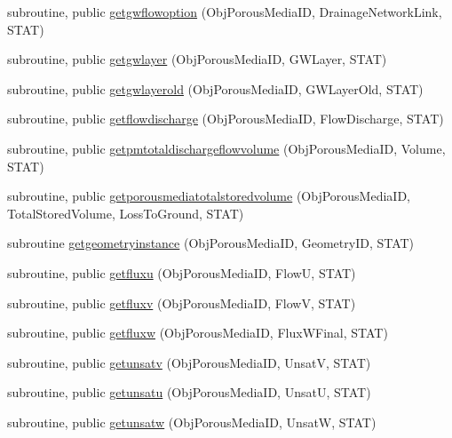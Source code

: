 \begin{DoxyCompactItemize}
\item 
subroutine, public \mbox{\hyperlink{namespacemoduleporousmedia_a959d8f66b0c720fa0d26da43495843eb}{getgwflowoption}} (Obj\+Porous\+Media\+ID, Drainage\+Network\+Link, S\+T\+AT)
\item 
subroutine, public \mbox{\hyperlink{namespacemoduleporousmedia_a48f51dadcb6b3234ad3625d8e26cb7bc}{getgwlayer}} (Obj\+Porous\+Media\+ID, G\+W\+Layer, S\+T\+AT)
\item 
subroutine, public \mbox{\hyperlink{namespacemoduleporousmedia_aa697c2ff7c0b471220e55d71bd4c665a}{getgwlayerold}} (Obj\+Porous\+Media\+ID, G\+W\+Layer\+Old, S\+T\+AT)
\item 
subroutine, public \mbox{\hyperlink{namespacemoduleporousmedia_a26ca2f410bb96e145f78213b45a7a519}{getflowdischarge}} (Obj\+Porous\+Media\+ID, Flow\+Discharge, S\+T\+AT)
\item 
subroutine, public \mbox{\hyperlink{namespacemoduleporousmedia_a4ef35ba24ac6cd6fbf310e39c0892c80}{getpmtotaldischargeflowvolume}} (Obj\+Porous\+Media\+ID, Volume, S\+T\+AT)
\item 
subroutine, public \mbox{\hyperlink{namespacemoduleporousmedia_a3a5ad5a7ceee985765e313febb118f98}{getporousmediatotalstoredvolume}} (Obj\+Porous\+Media\+ID, Total\+Stored\+Volume, Loss\+To\+Ground, S\+T\+AT)
\item 
subroutine \mbox{\hyperlink{namespacemoduleporousmedia_abf74842fd7f071be6dfbcb008ae86d92}{getgeometryinstance}} (Obj\+Porous\+Media\+ID, Geometry\+ID, S\+T\+AT)
\item 
subroutine, public \mbox{\hyperlink{namespacemoduleporousmedia_adf0daee2f37be73787378affc272dbc0}{getfluxu}} (Obj\+Porous\+Media\+ID, FlowU, S\+T\+AT)
\item 
subroutine, public \mbox{\hyperlink{namespacemoduleporousmedia_a7232e9ac88cf3c92c636f7432acbec07}{getfluxv}} (Obj\+Porous\+Media\+ID, FlowV, S\+T\+AT)
\item 
subroutine, public \mbox{\hyperlink{namespacemoduleporousmedia_a5f6e92f6c7e21ae5b9a8b35203c299c7}{getfluxw}} (Obj\+Porous\+Media\+ID, Flux\+W\+Final, S\+T\+AT)
\item 
subroutine, public \mbox{\hyperlink{namespacemoduleporousmedia_ae1e42504208d748be9b82e97810025bf}{getunsatv}} (Obj\+Porous\+Media\+ID, UnsatV, S\+T\+AT)
\item 
subroutine, public \mbox{\hyperlink{namespacemoduleporousmedia_a4a8574c685ff8e68510803b38c3821ad}{getunsatu}} (Obj\+Porous\+Media\+ID, UnsatU, S\+T\+AT)
\item 
subroutine, public \mbox{\hyperlink{namespacemoduleporousmedia_a34b7f3e33813dc9217457bf375eb5d30}{getunsatw}} (Obj\+Porous\+Media\+ID, UnsatW, S\+T\+AT)

\end{DoxyCompactItemize}
